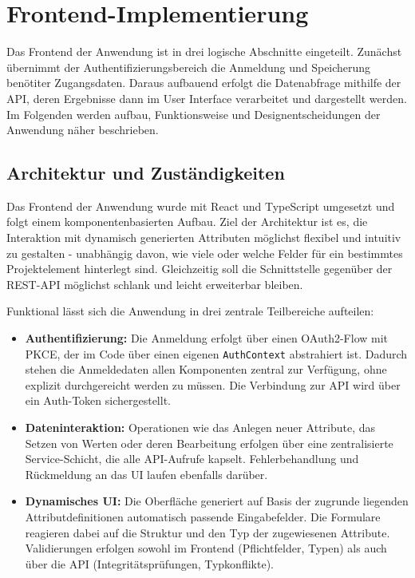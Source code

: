 \section{Frontend-Implementierung}
Das Frontend der Anwendung ist in drei logische Abschnitte eingeteilt. Zunächst übernimmt der Authentifizierungsbereich die Anmeldung und Speicherung benötiter 
Zugangsdaten. Daraus aufbauend erfolgt die Datenabfrage mithilfe der API, deren Ergebnisse dann im User Interface verarbeitet und dargestellt werden.
Im Folgenden werden aufbau, Funktionsweise und Designentscheidungen der Anwendung näher beschrieben.

\subsection{Architektur und Zuständigkeiten}

Das Frontend der Anwendung wurde mit React und TypeScript umgesetzt und folgt einem komponentenbasierten Aufbau. 
Ziel der Architektur ist es, die Interaktion mit dynamisch generierten Attributen möglichst flexibel und intuitiv zu gestalten - 
unabhängig davon, wie viele oder welche Felder für ein bestimmtes Projektelement hinterlegt sind. 
Gleichzeitig soll die Schnittstelle gegenüber der REST-API möglichst schlank und leicht erweiterbar bleiben.

Funktional lässt sich die Anwendung in drei zentrale Teilbereiche aufteilen:

\begin{itemize}
  \item \textbf{Authentifizierung:} Die Anmeldung erfolgt über einen OAuth2-Flow mit PKCE, der im Code über einen eigenen \texttt{AuthContext} abstrahiert ist. 
  Dadurch stehen die Anmeldedaten allen Komponenten zentral zur Verfügung, ohne explizit durchgereicht werden zu müssen. 
  Die Verbindung zur API wird über ein Auth-Token sichergestellt.

  \item \textbf{Dateninteraktion:} Operationen wie das Anlegen neuer Attribute, das Setzen von Werten oder deren Bearbeitung erfolgen über eine 
  zentralisierte Service-Schicht, die alle API-Aufrufe kapselt. Fehlerbehandlung und Rückmeldung an das UI laufen ebenfalls darüber.

  \item \textbf{Dynamisches UI:} Die Oberfläche generiert auf Basis der zugrunde liegenden Attributdefinitionen automatisch passende Eingabefelder. 
  Die Formulare reagieren dabei auf die Struktur und den Typ der zugewiesenen Attribute. Validierungen erfolgen sowohl im Frontend (Pflichtfelder, Typen) 
  als auch über die API (Integritätsprüfungen, Typkonflikte).
\end{itemize}

